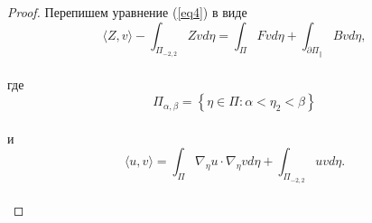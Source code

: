 \documentclass[12pt,titlepage]{report}
\begin{document}
\begin{proof}
  	Перепишем уравнение (\ref{eq4}) в виде\\
  	\begin{equation}
	 \label{eq5} 	
	  	\langle Z, v\rangle-\int_{\Pi_{-2,2}} Z v d \eta=\int_{\Pi} F v d \eta+\int_{\partial \Pi_{\|}} B v d \eta,
	 \end{equation}\\
	 где\\
	 $$\Pi_{\alpha, \beta}=\left\{\eta \in \Pi: \alpha<\eta_{2}<\beta\right\}$$\\
	 и\\
	 \begin{equation}
	 \label{eq6}
	 	\langle u, v\rangle=\int_{\Pi} \nabla_{\eta} u \cdot \nabla_{\eta} v d \eta+\int_{\Pi_{-2,2}} u v d \eta.
	 \end{equation}\\
	 

\end{proof}
\end{document}
